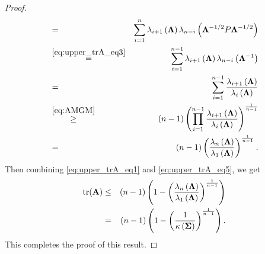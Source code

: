 \documentclass[numsec,webpdf,modern,medium,namedate]{oup-authoring-template}
\theoremstyle{thmstyleone}%
\theoremstyle{thmstyletwo}%
\theoremstyle{thmstylethree}%
\begin{document}
\begin{proof}
\begin{eqnarray}
        & = & \sum_{i = 1}^n \lambda_{i+1} \left( \boldsymbol{\Lambda} \right) \lambda_{n - i} \left( \boldsymbol{\Lambda}^{-1/2} P \boldsymbol{\Lambda}^{-1/2} \right) \notag \\
        & \overset{\eqref{eq:upper_trA_eq3}}{=} & \sum_{i = 1}^{n - 1} \lambda_{i+1} \left( \boldsymbol{\Lambda} \right) \lambda_{n - i} \left( \boldsymbol{\Lambda}^{-1} \right) \notag \\
        & = & \sum_{i = 1}^{n - 1} \frac{\lambda_{i+1}\left( \boldsymbol{\Lambda} \right)}{\lambda_i \left( \boldsymbol{\Lambda} \right)} \notag \\
        & \overset{\eqref{eq:AMGM}}{\geq} & (n - 1) \left( \prod_{i = 1}^{n - 1} \frac{\lambda_{i+1}\left( \boldsymbol{\Lambda} \right)}{\lambda_i \left( \boldsymbol{\Lambda} \right)} \right)^{\frac{1}{n-1}} \notag \\
         & = & (n - 1) \left( \frac{\lambda_{n}\left( \boldsymbol{\Lambda} \right)}{\lambda_1 \left( \boldsymbol{\Lambda} \right)} \right)^{\frac{1}{n-1}}. \label{eq:upper_trA_eq5}
    \end{eqnarray}
    Then combining \eqref{eq:upper_trA_eq1} and \eqref{eq:upper_trA_eq5}, we get
    \begin{eqnarray*}
        \mathrm{tr}(\mathbf{A}) & \leq & (n - 1) \left( 1 - \left( \frac{\lambda_{n}\left( \boldsymbol{\Lambda} \right)}{\lambda_1 \left( \boldsymbol{\Lambda} \right)} \right)^{\frac{1}{n-1}} \right) \\
        & = & (n - 1) \left( 1 - \left( \frac{1}{\kappa \left( {\boldsymbol{\Sigma}} \right)} \right)^{\frac{1}{n-1}} \right).
    \end{eqnarray*}
    This completes the proof of this result.


\end{proof}
\end{document}
